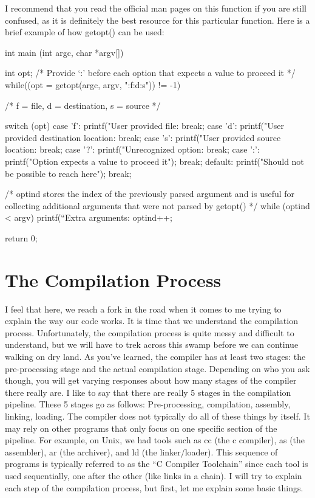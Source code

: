 \documentclass{article}
\begin{document}
I recommend that you read the official man pages on this function if you are still confused, as it is
definitely the best resource for this particular function. Here is a brief example of how getopt() can be
used:

\begin{cblk}
int main (int argc, char *argv[]) {
   int opt;
   /* Provide ‘:’ before each option that expects a value to proceed it */
   while((opt = getopt(argc, argv, ":f:d:s")) != -1) {  /* f = file, d = destination, s = source */

      switch (opt) {
         case 'f':
            printf("User provided file: %
            break;
         case 'd':
            printf("User provided destination location: %
            break;
         case 's':
            printf("User provided source location: %
            break;
         case '?':
            printf("Unrecognized option: %
            break;
         case ':':
            printf("Option expects a value to proceed it\n");
            break;
         default:
            printf("Should not be possible to reach here\n");
            break;
      }
   }
 /* optind stores the index of the previously parsed argument and is useful
     for collecting additional arguments that were not parsed by getopt() */
   while (optind < argv) {
	printf(“Extra arguments: %
	optind++;
}

   return 0;
}
\end{cblk}

\section{The Compilation Process}

I feel that here, we reach a fork in the road when it comes to me trying to explain the way our code works.
It is time that we understand the compilation process. Unfortunately, the compilation process is quite messy
and difficult to understand, but we will have to trek across this swamp before we can continue walking on dry
land. As you’ve learned, the compiler has at least two stages: the pre-processing stage and the actual
compilation stage. Depending on who you ask though, you will get varying responses about how many stages of
the compiler there really are. I like to say that there are really 5 stages in the compilation pipeline.
These 5 stages go as follows: Pre-processing, compilation, assembly, linking, loading. The compiler does
not typically do all of these things by itself. It may rely on other programs that only focus on one specific
section of the pipeline. For example, on Unix, we had tools such as cc (the c compiler), as (the assembler),
ar (the archiver), and ld (the linker/loader). This sequence of programs is typically referred to as the “C
Compiler Toolchain” since each tool is used sequentially, one after the other (like links in a chain). I will
try to explain each step of the compilation process, but first, let me explain some basic things.
\end{document}
